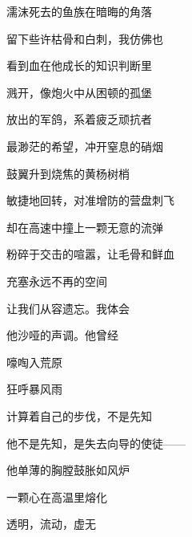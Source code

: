 濡沫死去的鱼族在暗晦的角落

留下些许枯骨和白刺，我仿佛也

看到血在他成长的知识判断里

溅开，像炮火中从困顿的孤堡

放出的军鸽，系着疲乏顽抗者

最渺茫的希望，冲开窒息的硝烟

鼓翼升到烧焦的黄杨树梢

敏捷地回转，对准增防的营盘刺飞

却在高速中撞上一颗无意的流弹

粉碎于交击的喧嚣，让毛骨和鲜血

充塞永远不再的空间

让我们从容遗忘。我体会

他沙哑的声调。他曾经

嚎啕入荒原

狂呼暴风雨

计算着自己的步伐，不是先知

他不是先知，是失去向导的使徒——

他单薄的胸膛鼓胀如风炉

一颗心在高温里熔化

透明，流动，虚无
